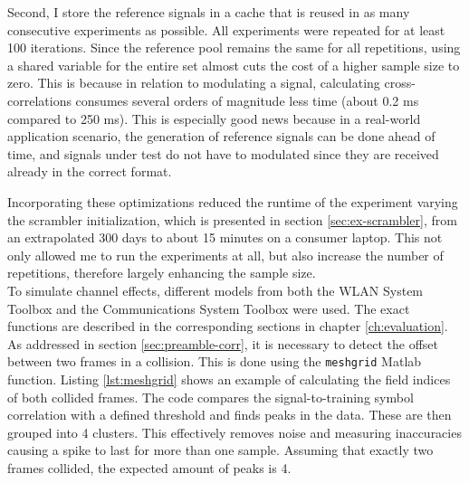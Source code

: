 Second, I store the reference signals in a cache that is reused in as many consecutive experiments as possible. All experiments were repeated for at least 100 iterations. Since the reference pool remains the same for all repetitions, using a shared variable for the entire set almost cuts the cost of a higher sample size to zero. This is because in relation to modulating a signal, calculating cross-correlations consumes several orders of magnitude less time (about 0.2 ms compared to 250 ms). This is especially good news because in a real-world application scenario, the generation of reference signals can be done ahead of time, and signals under test do not have to modulated since they are received already in the correct format.

Incorporating these optimizations reduced the runtime of the experiment varying the scrambler initialization, which is presented in section \ref{sec:ex-scrambler}, from an extrapolated 300 days to about 15 minutes on a consumer laptop. This not only allowed me to run the experiments at all, but also increase the number of repetitions, therefore largely enhancing the sample size.\\

To simulate channel effects, different models from both the WLAN System Toolbox and the Communications System Toolbox \cite{commtoolbox} were used. The exact functions are described in the corresponding sections in chapter \ref{ch:evaluation}.\\

As addressed in section \ref{sec:preamble-corr}, it is necessary to detect the offset between two frames in a collision. This is done using the \texttt{meshgrid} Matlab function. Listing \ref{lst:meshgrid} shows an example of calculating the field indices of both collided frames. The code compares the signal-to-training symbol correlation with a defined threshold and finds peaks in the data. These are then grouped into 4 clusters. This effectively removes noise and measuring inaccuracies causing a spike to last for more than one sample. Assuming that exactly two frames collided, the expected amount of peaks is 4.

